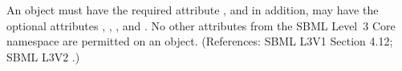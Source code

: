 An \Event object must have the required attribute
, and in addition, may have the optional
attributes  , , , and .
No other attributes from the SBML Level~3 Core namespace are permitted on
an \Event object.  (References: SBML L3V1 Section 4.12; SBML L3V2 .)
